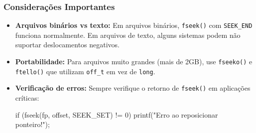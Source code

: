 \subsubsection{Considerações Importantes}

\begin{itemize}
    \item \textbf{Arquivos binários vs texto:} Em arquivos binários, \texttt{fseek()} com 
        \texttt{SEEK\_END} funciona normalmente. Em arquivos de texto, alguns sistemas 
        podem não suportar deslocamentos negativos.
    
    \item \textbf{Portabilidade:} Para arquivos muito grandes (mais de 2GB), use \texttt{fseeko()} 
        e \texttt{ftello()} que utilizam \texttt{off\_t} em vez de \texttt{long}.
    
    \item \textbf{Verificação de erros:} Sempre verifique o retorno de \texttt{fseek()} 
        em aplicações críticas:
    \begin{excode}
    if (fseek(fp, offset, SEEK_SET) != 0) {
        printf("Erro ao reposicionar ponteiro!\n");
    }
    \end{excode}
\end{itemize}
